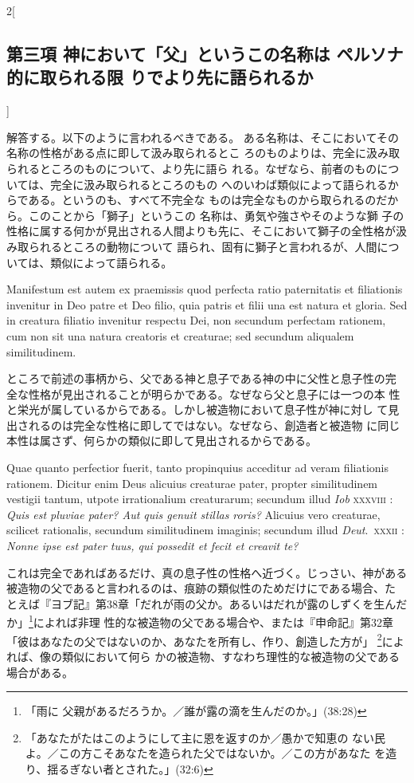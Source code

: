 \documentclass[paper=a4paper,fontsize=10pt,jafontsize=9pt,titlepage]{jlreq}
\begin{document}
\begin{paracol}{2}[\subsection{第三項 神において「父」というこの名称は ペルソナ的に取られる限 りでより先に語られるか}]
\switchcolumn


解答する。以下のように言われるべきである。
ある名称は、そこにおいてその名称の性格がある点に即して汲み取られるとこ
 ろのものよりは、完全に汲み取られるところのものについて、より先に語ら
 れる。なぜなら、前者のものについては、完全に汲み取られるところのもの
 へのいわば類似によって語られるからである。というのも、すべて不完全な
 ものは完全なものから取られるのだから。このことから「獅子」というこの
 名称は、勇気や強さやそのような獅
 子の性格に属する何かが見出される人間よりも先に、そこにおいて獅子の全性格が汲み取られるところの動物について
語られ、固有に獅子と言われるが、人間については、類似によって語られる。


\switchcolumn*


Manifestum est autem ex praemissis quod perfecta ratio
paternitatis et filiationis invenitur in Deo patre et Deo filio, quia
patris et filii una est natura et gloria. Sed in creatura filiatio
invenitur respectu Dei, non secundum perfectam rationem, cum non sit
una natura creatoris et creaturae; sed secundum aliqualem
similitudinem.


\switchcolumn


ところで前述の事柄から、父である神と息子である神の中に父性と息子性の完
 全な性格が見出されることが明らかである。なぜなら父と息子には一つの本
 性と栄光が属しているからである。しかし被造物において息子性が神に対し
 て見出されるのは完全な性格に即してではない。なぜなら、創造者と被造物
 に同じ本性は属さず、何らかの類似に即して見出されるからである。


\switchcolumn*


Quae quanto perfectior fuerit, tanto propinquius
acceditur ad veram filiationis rationem. Dicitur enim Deus alicuius
creaturae pater, propter similitudinem vestigii tantum, utpote
irrationalium creaturarum; secundum illud {\itshape Iob} {\scshape
 xxxviii} : {\itshape Quis est
pluviae pater? Aut quis genuit stillas roris?} Alicuius vero creaturae,
scilicet rationalis, secundum similitudinem imaginis; secundum illud
{\itshape Deut}.~{\scshape xxxii} : {\itshape Nonne ipse est pater tuus, qui possedit et fecit et
creavit te?}


\switchcolumn


これは完全であればあるだけ、真の息子性の性格へ近づく。じっさい、神がある
 被造物の父であると言われるのは、痕跡の類似性のためだけにである場合、た
 とえば『ヨブ記』第38章「だれが雨の父か。あるいはだれが露のしずくを生んだか」\footnote{「雨に
 父親があるだろうか。／誰が露の滴を生んだのか。」(38:28)}によれば非理
 性的な被造物の父である場合や、または『申命記』第32章「彼はあなたの父ではないのか、あなたを所有し、作り、創造した方が」
 \footnote{「あなたがたはこのようにして主に恩を返すのか／愚かで知恵の
 ない民よ。／この方こそあなたを造られた父ではないか。／この方があなた
 を造り、揺るぎない者とされた。」(32:6)}によれば、像の類似において何ら
 かの被造物、すなわち理性的な被造物の父である場合がある。



\end{paracol}
\end{document}
